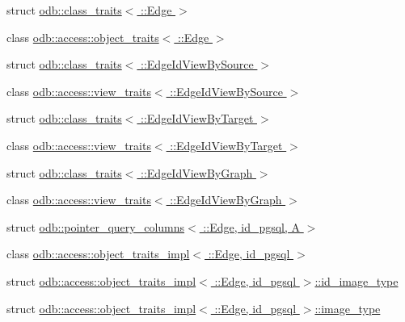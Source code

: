 \begin{DoxyCompactItemize}
\item 
struct \hyperlink{structodb_1_1class__traits_3_01_1_1_edge_01_4}{odb\+::class\+\_\+traits$<$ \+::\+Edge $>$}
\item 
class \hyperlink{classodb_1_1access_1_1object__traits_3_01_1_1_edge_01_4}{odb\+::access\+::object\+\_\+traits$<$ \+::\+Edge $>$}
\item 
struct \hyperlink{structodb_1_1class__traits_3_01_1_1_edge_id_view_by_source_01_4}{odb\+::class\+\_\+traits$<$ \+::\+Edge\+Id\+View\+By\+Source $>$}
\item 
class \hyperlink{classodb_1_1access_1_1view__traits_3_01_1_1_edge_id_view_by_source_01_4}{odb\+::access\+::view\+\_\+traits$<$ \+::\+Edge\+Id\+View\+By\+Source $>$}
\item 
struct \hyperlink{structodb_1_1class__traits_3_01_1_1_edge_id_view_by_target_01_4}{odb\+::class\+\_\+traits$<$ \+::\+Edge\+Id\+View\+By\+Target $>$}
\item 
class \hyperlink{classodb_1_1access_1_1view__traits_3_01_1_1_edge_id_view_by_target_01_4}{odb\+::access\+::view\+\_\+traits$<$ \+::\+Edge\+Id\+View\+By\+Target $>$}
\item 
struct \hyperlink{structodb_1_1class__traits_3_01_1_1_edge_id_view_by_graph_01_4}{odb\+::class\+\_\+traits$<$ \+::\+Edge\+Id\+View\+By\+Graph $>$}
\item 
class \hyperlink{classodb_1_1access_1_1view__traits_3_01_1_1_edge_id_view_by_graph_01_4}{odb\+::access\+::view\+\_\+traits$<$ \+::\+Edge\+Id\+View\+By\+Graph $>$}
\item 
struct \hyperlink{structodb_1_1pointer__query__columns_3_01_1_1_edge_00_01id__pgsql_00_01_a_01_4}{odb\+::pointer\+\_\+query\+\_\+columns$<$ \+::\+Edge, id\+\_\+pgsql, A $>$}
\item 
class \hyperlink{classodb_1_1access_1_1object__traits__impl_3_01_1_1_edge_00_01id__pgsql_01_4}{odb\+::access\+::object\+\_\+traits\+\_\+impl$<$ \+::\+Edge, id\+\_\+pgsql $>$}
\item 
struct \hyperlink{structodb_1_1access_1_1object__traits__impl_3_01_1_1_edge_00_01id__pgsql_01_4_1_1id__image__type}{odb\+::access\+::object\+\_\+traits\+\_\+impl$<$ \+::\+Edge, id\+\_\+pgsql $>$\+::id\+\_\+image\+\_\+type}
\item 
struct \hyperlink{structodb_1_1access_1_1object__traits__impl_3_01_1_1_edge_00_01id__pgsql_01_4_1_1image__type}{odb\+::access\+::object\+\_\+traits\+\_\+impl$<$ \+::\+Edge, id\+\_\+pgsql $>$\+::image\+\_\+type}
\item 

\end{DoxyCompactItemize}
